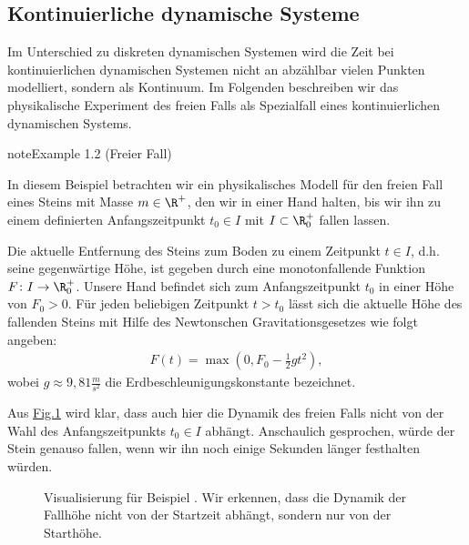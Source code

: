\documentclass[letterpaper,10pt,english]{jupyterBook}
\begin{document}
\subsection{Kontinuierliche dynamische Systeme}
\label{\detokenize{ode/dynamicSystems:kontinuierliche-dynamische-systeme}}
\sphinxAtStartPar
Im Unterschied zu diskreten dynamischen Systemen wird die Zeit bei kontinuierlichen dynamischen Systemen nicht an abzählbar vielen Punkten modelliert, sondern als Kontinuum.
Im Folgenden beschreiben wir das physikalische Experiment des freien Falls als Spezialfall eines kontinuierlichen dynamischen Systems.
\label{ode/dynamicSystems:ex:freefall}
\begin{sphinxadmonition}{note}{Example 1.2 (Freier Fall)}



\sphinxAtStartPar
In diesem Beispiel betrachten wir ein physikalisches Modell für den freien Fall eines Steins mit Masse \(m \in \R^+\), den wir in einer Hand halten, bis wir ihn zu einem definierten Anfangszeitpunkt \(t_0 \in I\) mit \(I \subset \R^+_0\) fallen lassen.

\sphinxAtStartPar
Die aktuelle Entfernung des Steins zum Boden zu einem Zeitpunkt \(t \in I\), d.h. seine gegenwärtige Höhe, ist gegeben durch eine monoton\sphinxhyphen{}fallende Funktion \(F \colon I \rightarrow \R^+_0\).
Unsere Hand befindet sich zum Anfangszeitpunkt \(t_0\) in einer Höhe von \(F_0 > 0\).
Für jeden beliebigen Zeitpunkt \(t > t_0\) lässt sich die aktuelle Höhe des fallenden Steins mit Hilfe des Newtonschen Gravitationsgesetzes wie folgt angeben:
\begin{equation*}
\begin{split}F(t) = \max(0, F_0 - \frac{1}{2}gt^2),\end{split}
\end{equation*}
\sphinxAtStartPar
wobei \(g \approx 9,81 \frac{m}{s^2}\) die Erdbeschleunigungskonstante bezeichnet.

\sphinxAtStartPar
Aus \hyperref[\detokenize{ode/dynamicSystems:fig-free-fall}]{Fig.\@ \ref{\detokenize{ode/dynamicSystems:fig-free-fall}}} wird klar, dass auch hier die Dynamik des freien Falls nicht von der Wahl des Anfangszeitpunkts \(t_0 \in I\) abhängt.
Anschaulich gesprochen, würde der Stein genauso fallen, wenn wir ihn noch einige Sekunden länger festhalten würden.
\end{sphinxadmonition}

\begin{figure}[htbp]
\centering
\capstart

\noindent{}
\caption{Visualisierung für Beispiel {\hyperref[\detokenize{ode/dynamicSystems:ex:freefall}]{}}. Wir erkennen, dass die Dynamik der Fallhöhe nicht von der Startzeit abhängt, sondern nur von der Starthöhe.}\label{\detokenize{ode/dynamicSystems:fig-free-fall}}\end{figure}
\end{document}
